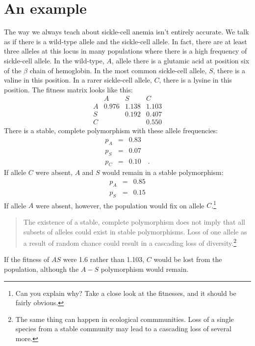 \documentclass[12pt]{article}
\begin{document}
\section*{An example}

The way we always teach about sickle-cell anemia isn't entirely
accurate. We talk as if there is a wild-type allele and the
sickle-cell allele. In fact, there are at least three alleles at this
locus in many populations where there is a high frequency of
sickle-cell allele. In the wild-type, $A$, allele there is a glutamic
acid at position six of the $\beta$ chain of hemoglobin. In the most
common sickle-cell allele, $S$, there is a valine in this position. In
a rarer sickle-cell allele, $C$, there is a lysine in this
position. The fitness matrix looks like this:
\[
\begin{array}{cccc}
  & A     & S     & C \\
A & 0.976 & 1.138 & 1.103 \\
S &       & 0.192 & 0.407 \\
C &       &       & 0.550
\end{array}
\]
There is a stable, complete polymorphism with these allele frequencies:
\begin{eqnarray*}
p_A &=& 0.83 \\
p_S &=& 0.07 \\
p_C &=& 0.10 \quad .
\end{eqnarray*}
If allele $C$ were absent, $A$ and $S$ would remain in a stable
polymorphism:
\begin{eqnarray*}
p_A &=& 0.85 \\
p_S &=& 0.15
\end{eqnarray*}
If allele $A$ were absent, however, the population would fix on allele
$C$.\footnote{Can you explain why? Take a close look at the fitnesses,
  and it should be fairly obvious.}

\begin{quote}
The existence of a stable, complete polymorphism does not imply that
all subsets of alleles could exist in stable polymorphisms. Loss of
one allele as a result of random chance could result in a cascading
loss of diversity.\footnote{The same thing can happen in ecological
  commmunities. Loss of a single species from a stable community may
  lead to a cascading loss of several more.}
\end{quote}

\noindent If the fitness of $AS$ were 1.6 rather than 1.103, $C$ would
be lost from the population, although the $A-S$ polymorphism would
remain.
\end{document}
